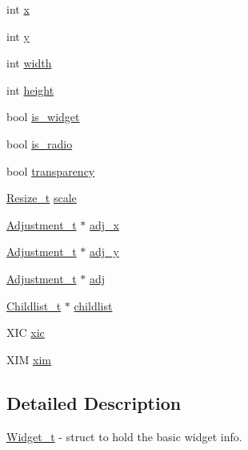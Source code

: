 \begin{DoxyCompactItemize}
\item 
int \hyperlink{structWidget__t_aac6ce7621b682bb4ce88bac9181c34a7}{x}
\item 
int \hyperlink{structWidget__t_acb9402de44e47837e1821b93fc052b38}{y}
\item 
int \hyperlink{structWidget__t_a3204c88196ed5793250b3530dd719037}{width}
\item 
int \hyperlink{structWidget__t_a1def6d2237743e75a0b84ca0c34a6834}{height}
\item 
bool \hyperlink{structWidget__t_aff0b7ecbf87b995342d13e2efe79dfca}{is\+\_\+widget}
\item 
bool \hyperlink{structWidget__t_acb0bba70f001420ed9a33128c10e74ed}{is\+\_\+radio}
\item 
bool \hyperlink{structWidget__t_a42a597c21eca964c0296fc7026feb43b}{transparency}
\item 
\hyperlink{structResize__t}{Resize\+\_\+t} \hyperlink{structWidget__t_a9a2d5b53f40f5bf3914fc0694027d7ec}{scale}
\item 
\hyperlink{structAdjustment__t}{Adjustment\+\_\+t} $\ast$ \hyperlink{structWidget__t_aabc05e0a46c85d24483fae36127b45dd}{adj\+\_\+x}
\item 
\hyperlink{structAdjustment__t}{Adjustment\+\_\+t} $\ast$ \hyperlink{structWidget__t_abde95d3fb49faff5dd852f16810115e7}{adj\+\_\+y}
\item 
\hyperlink{structAdjustment__t}{Adjustment\+\_\+t} $\ast$ \hyperlink{structWidget__t_af3fdf65eb9a663016b91ee87a96d75a8}{adj}
\item 
\hyperlink{structChildlist__t}{Childlist\+\_\+t} $\ast$ \hyperlink{structWidget__t_ac203ccbc58958a7c205897d4aba197e9}{childlist}
\item 
X\+IC \hyperlink{structWidget__t_adafb1b98ea551ef726be6c726ac2e817}{xic}
\item 
X\+IM \hyperlink{structWidget__t_a81aa76d336043a7230844d09a92113e2}{xim}
\end{DoxyCompactItemize}


\subsection{Detailed Description}
\hyperlink{structWidget__t}{Widget\+\_\+t} -\/ struct to hold the basic widget info. 


